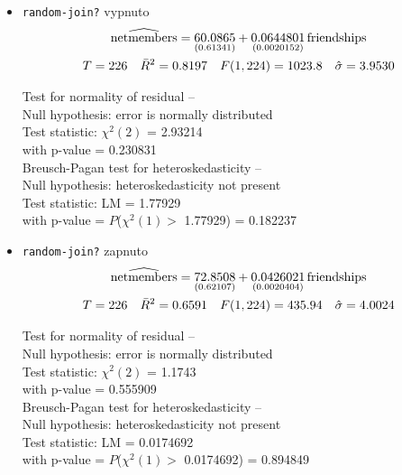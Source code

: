 \documentclass[a4wide,12pt]{report}
\begin{document}
\begin{itemize}
\item \texttt{random-join?} vypnuto\\
\begin{gather}
\widehat{\rm netmembers} = 
\underset{(0.61341)}{60.0865}
+\underset{(0.0020152)}{0.0644801}\,\mbox{friendships}
 \notag \\
T = 226 \quad \bar{R}^2 = 0.8197 \quad F(1,224) = 1023.8 \quad \hat{\sigma} = 3.9530 \notag
\end{gather}
\begin{center}

\begin{raggedright}
Test for normality of residual --\\
\quad Null hypothesis: error is normally distributed\\
\quad Test statistic: $\chi^2(2)$ = 2.93214\\
\quad with p-value = 0.230831\\
\vspace{1ex}
Breusch-Pagan test for heteroskedasticity --\\
\quad Null hypothesis: heteroskedasticity not present\\
\quad Test statistic: LM = 1.77929\\
\quad with p-value = $P$($\chi^2(1) >$ 1.77929) = 0.182237\\
\vspace{1ex}
\end{raggedright}

\end{center}

\item \texttt{random-join?} zapnuto\\
\begin{gather}
\widehat{\rm netmembers} = 
\underset{(0.62107)}{72.8508}
+\underset{(0.0020404)}{0.0426021}\,\mbox{friendships}
 \notag \\
T = 226 \quad \bar{R}^2 = 0.6591 \quad F(1,224) = 435.94 \quad \hat{\sigma} = 4.0024 \notag
\end{gather}
\begin{center}

\begin{raggedright}
Test for normality of residual --\\
\quad Null hypothesis: error is normally distributed\\
\quad Test statistic: $\chi^2(2)$ = 1.1743\\
\quad with p-value = 0.555909\\
\vspace{1ex}
Breusch-Pagan test for heteroskedasticity --\\
\quad Null hypothesis: heteroskedasticity not present\\
\quad Test statistic: LM = 0.0174692\\
\quad with p-value = $P$($\chi^2(1) >$ 0.0174692) = 0.894849\\
\vspace{1ex}
\end{raggedright}

\end{center}

\end{itemize}
\end{document}
